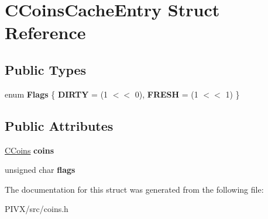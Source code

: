 \hypertarget{struct_c_coins_cache_entry}{}\section{C\+Coins\+Cache\+Entry Struct Reference}
\label{struct_c_coins_cache_entry}
\subsection*{Public Types}
\begin{DoxyCompactItemize}
\item 
\mbox{\label{struct_c_coins_cache_entry_a1d5ac74da0f6ff5ab056e47ce79753c7}} 
enum {\bfseries Flags} \{ {\bfseries D\+I\+R\+TY} = (1 $<$$<$ 0), 
{\bfseries F\+R\+E\+SH} = (1 $<$$<$ 1)
 \}
\end{DoxyCompactItemize}
\subsection*{Public Attributes}
\begin{DoxyCompactItemize}
\item 
\mbox{\label{struct_c_coins_cache_entry_a343585f1fcb810f9c21fc25ae42a1eba}} 
\mbox{\hyperlink{class_c_coins}{C\+Coins}} {\bfseries coins}
\item 
\mbox{\label{struct_c_coins_cache_entry_a05225c349f51777385e3a1c9b0eeaaed}} 
unsigned char {\bfseries flags}
\end{DoxyCompactItemize}


The documentation for this struct was generated from the following file\+:\begin{DoxyCompactItemize}
\item 
P\+I\+V\+X/src/coins.\+h\end{DoxyCompactItemize}
